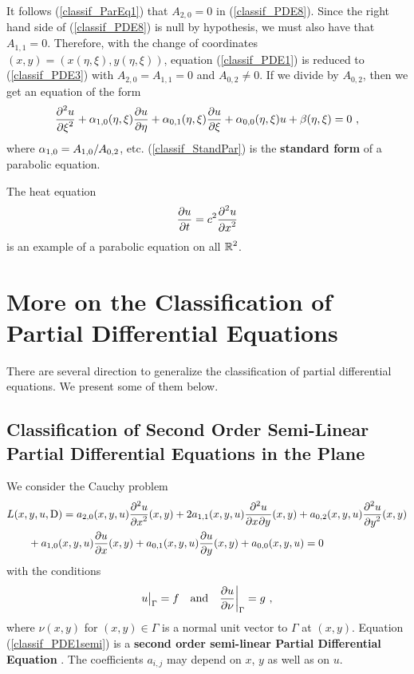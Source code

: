 It follows (\ref{classif_ParEq1}) that $A_{2,0}=0$ in
(\ref{classif_PDE8}).  Since the right hand side of
(\ref{classif_PDE8}) is null by hypothesis, we must also have that
$A_{1,1}=0$.
Therefore, with the change of coordinates $(x,y)=(x(\eta,\xi),y(\eta,\xi))$,
equation (\ref{classif_PDE1}) is reduced to
(\ref{classif_PDE3}) with $A_{2,0} = A_{1,1} = 0$ and $A_{0,2} \neq 0$.
If we divide by $A_{0,2}$, then we get an equation of the form
\begin{equation} \label{classif_StandPar}
\pdydxn{u}{\xi}{2}
+ \alpha_{1,0}(\eta,\xi) \pdydx{u}{\eta}
+ \alpha_{0,1}(\eta,\xi) \pdydx{u}{\xi} + \alpha_{0,0}(\eta,\xi)u +
\beta (\eta,\xi) = 0 \  , 
\end{equation}
where $\DS \alpha_{1,0} = A_{1,0}/A_{0,2}$, etc.
(\ref{classif_StandPar}) is the
{\bfseries standard form} of a parabolic equation.

\begin{egg}
The heat equation
\[
\pdydx{u}{t} = c^2 \pdydxn{u}{x}{2}
\]
is an example of a parabolic equation on all $\DS \RR^2$.
\end{egg}

\section{More on the Classification of Partial Differential
Equations}

There are several direction to generalize the classification of
partial differential equations.  We present some of them below.

\subsection{Classification of Second Order Semi-Linear Partial
Differential Equations in the Plane}

We consider the Cauchy problem
\begin{align}
& L(x,y,u,\diff) = a_{2,0}(x,y,u) \pdydxn{u}{x}{2}(x,y)
+ 2a_{1,1}(x,y,u) \pdydxnm{u}{x}{y}{2}{}{}(x,y)
+ a_{0,2}(x,y,u) \pdydxn{u}{y}{2}(x,y) \nonumber \\
&\qquad + a_{1,0}(x,y,u) \pdydx{u}{x}(x,y)
+ a_{0,1}(x,y,u) \pdydx{u}{y}(x,y) + a_{0,0}(x,y,u) = 0
\label{classif_PDE1semi}
\end{align}
with the conditions
\begin{equation} \label{classif_PDE1semi_cond}
u\big|_\Gamma = f \quad \text{and} \quad \pdydx{u}{\nu}\bigg|_\Gamma = g \  ,
\end{equation}
where $\nu(x,y)$ for $(x,y)\in \Gamma$ is a normal unit vector to
$\Gamma$ at $(x,y)$.  Equation (\ref{classif_PDE1semi}) is a
{\bfseries second order semi-linear Partial Differential Equation}%
.
The coefficients $a_{i,j}$ may depend on $x$, $y$ as well as on $u$.

